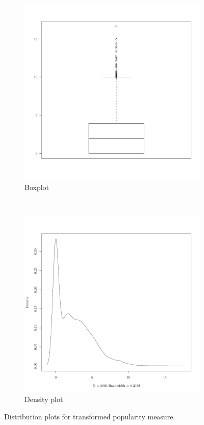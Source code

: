 \begin{figure}[!htb]
    \centering
    \begin{subfigure}[b]{0.3\textwidth}
        \includegraphics[width=\textwidth]{figures/popuTransformedBox}
        \caption{Boxplot}
        \label{fig:popuTransformedBox}
    \end{subfigure}
	~
    \begin{subfigure}[b]{0.3\textwidth}
        \includegraphics[width=\textwidth]{figures/popuTransformedDensity}
        \caption{Density plot}
        \label{fig:popuTransformedDensity}
    \end{subfigure}
    \caption{Distribution plots for transformed popularity measure.}
\end{figure}
